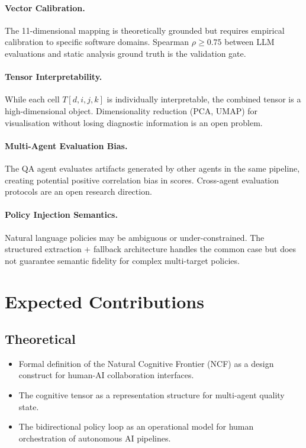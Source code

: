 \documentclass[manuscript,review,anonymous]{acmart}
\begin{document}
\paragraph{Vector Calibration.} The 11-dimensional mapping is theoretically grounded
but requires empirical calibration to specific software domains. Spearman $\rho \geq 0.75$
between LLM evaluations and static analysis ground truth is the validation gate.

\paragraph{Tensor Interpretability.} While each cell $T[d,i,j,k]$ is individually
interpretable, the combined tensor is a high-dimensional object. Dimensionality reduction
(PCA, UMAP) for visualisation without losing diagnostic information is an open problem.

\paragraph{Multi-Agent Evaluation Bias.} The QA agent evaluates artifacts generated by
other agents in the same pipeline, creating potential positive correlation bias in scores.
Cross-agent evaluation protocols are an open research direction.

\paragraph{Policy Injection Semantics.} Natural language policies may be ambiguous or
under-constrained. The structured extraction + fallback architecture handles the common
case but does not guarantee semantic fidelity for complex multi-target policies.

\section{Expected Contributions}

\subsection{Theoretical}

\begin{itemize}
  \item Formal definition of the Natural Cognitive Frontier (NCF) as a design
    construct for human-AI collaboration interfaces.
  \item The cognitive tensor as a representation structure for multi-agent quality state.
  \item The bidirectional policy loop as an operational model for human orchestration
    of autonomous AI pipelines.
\end{itemize}
\end{document}
